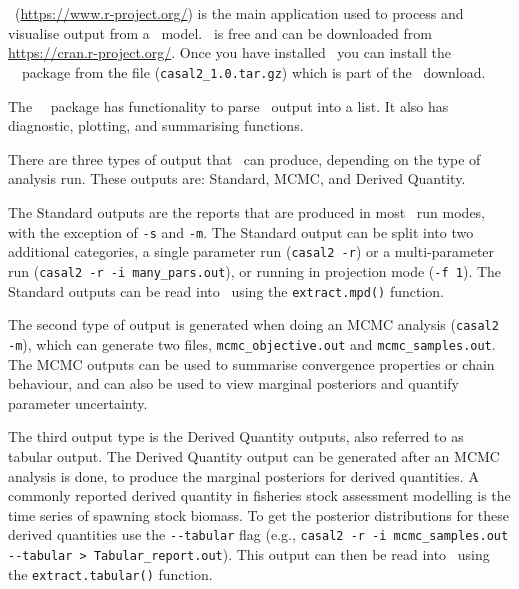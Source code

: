 \section{ \label{sec:post-processing}}

\R\ (\url{https://www.r-project.org/}) is the main application used to process and visualise output from a \CNAME\ model. \R\ is free and can be downloaded from \url{https://cran.r-project.org/}. Once you have installed \R\ you can install the \cname\ \R\ package from the file (\texttt{casal2\_1.0.tar.gz}) which is part of the \CNAME\ download.

The \CNAME\ \R\ package has functionality to parse \CNAME\ output into a list. It also has diagnostic, plotting, and summarising functions.

There are three types of output that \CNAME\ can produce, depending on the type of analysis run. These outputs are: Standard, MCMC, and Derived Quantity.

The Standard outputs are the reports that are produced in most \CNAME\ run modes, with the exception of \texttt{-s} and \texttt{-m}. The Standard output can be split into two additional categories, a single parameter run (\texttt{casal2 -r}) or a multi-parameter run (\texttt{casal2 -r -i many\_pars.out}), or running in projection mode (\texttt{-f 1}). The Standard outputs can be read into \R\ using the \texttt{extract.mpd()} function.

The second type of output is generated when doing an MCMC analysis (\texttt{casal2 -m}), which can generate two files, \texttt{mcmc\_objective.out} and \texttt{mcmc\_samples.out}. The MCMC outputs can be used to summarise convergence properties or chain behaviour, and can also be used to view marginal posteriors and quantify parameter uncertainty.

The third output type is the Derived Quantity outputs, also referred to as tabular output. The Derived Quantity output can be generated after an MCMC analysis is done, to produce the marginal posteriors for derived quantities. A commonly reported derived quantity in fisheries stock assessment modelling is the time series of spawning stock biomass. To get the posterior distributions for these derived quantities use the \texttt{-{}-tabular} flag (e.g., \texttt{casal2 -r -i mcmc\_samples.out -{}-tabular > Tabular\_report.out}). This output can then be read into \R\ using the \texttt{extract.tabular()} function.

